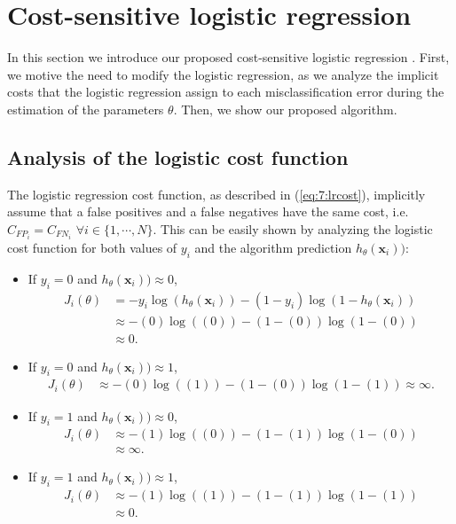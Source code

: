 \section{Cost-sensitive logistic regression}
\label{sec:7:cslr}

In this section we introduce our proposed cost-sensitive logistic regression 
\citep{CorreaBahnsen2014b}. First, we motive the need to modify the logistic regression, as we 
analyze the implicit costs that the logistic regression assign to each misclassification error 
during the estimation of the parameters $\theta$. Then, we show our proposed algorithm.


\subsection{Analysis of the logistic cost function}
\label{sec:7:log_cost_analysis}

The logistic regression cost function, as described in (\ref{eq:7:lrcost}), implicitly assume that 
a false positives and a false negatives have the same cost, i.e. $C_{{FP}_i} = C_{{FN}_i}$ $\forall 
i \in \{1,\cdots,N\}$. This can be easily shown by analyzing the logistic cost function for both 
values of $y_i$ and the algorithm prediction $h_\theta(\mathbf{x}_i))$:

\begin{itemize}
\item If $y_i=0$ and $h_\theta(\mathbf{x}_i)) \approx 0$, 
\begin{align*}
 J_i(\theta) &= -y_i\log(h_\theta(\mathbf{x}_i)) -(1-y_i)\log(1-h_\theta(\mathbf{x}_i)) \nonumber \\
 &\approx -(0)\log((0)) -(1-(0))\log(1-(0)) \nonumber \\
 &\approx 0.
\end{align*}

\item If $y_i=0$ and $h_\theta(\mathbf{x}_i)) \approx 1$, 
\begin{align*}
 J_i(\theta) &\approx -(0)\log((1)) -(1-(0))\log(1-(1)) %
 \approx \infty.
\end{align*}

\item If $y_i=1$ and $h_\theta(\mathbf{x}_i)) \approx 0$, 
\begin{align*}
 J_i(\theta) &\approx -(1)\log((0)) -(1-(1))\log(1-(0)) \nonumber \\
 &\approx \infty.
\end{align*}

\item If $y_i=1$ and $h_\theta(\mathbf{x}_i)) \approx 1$, 
\begin{align*}
 J_i(\theta) &\approx -(1)\log((1)) -(1-(1))\log(1-(1)) \nonumber \\
 &\approx 0.
\end{align*}
\end{itemize}

